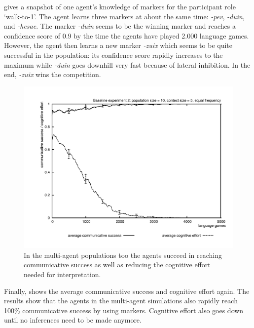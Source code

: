  gives a snapshot of one agent's knowledge of markers for the participant role `walk-to-1'. The agent learns three markers at about the same time: {\em -pev}, {\em -duin}, and {\em -hesae}. The marker {\em -duin} seems to be the winning marker and reaches a confidence score of 0.9 by the time the agents have played 2.000 language games. However, the agent then learns a new marker {\em -zuix} which seems to be quite successful in the population: its confidence score rapidly increases to the maximum while {\em -duin} goes downhill very fast because of lateral inhibition. In the end, {\em -zuix} wins the competition. 
\begin{figure}[t]
\centerline{\includegraphics[width=\textwidth]{Chapter3/figs/graph-base2-effort2}}
  \caption[Baseline experiment 2: success and effort (equal frequency)]{In the multi-agent populations too the agents succeed in reaching communicative success as well as reducing the cognitive effort needed for interpretation.}
   \label{f:base2-effort2}
\end{figure}

Finally,  shows the average communicative success and cognitive effort again. The results show that the agents in the multi-agent simulations also rapidly reach 100\% communicative success by using markers. Cognitive effort also goes down until no inferences need to be made anymore.


